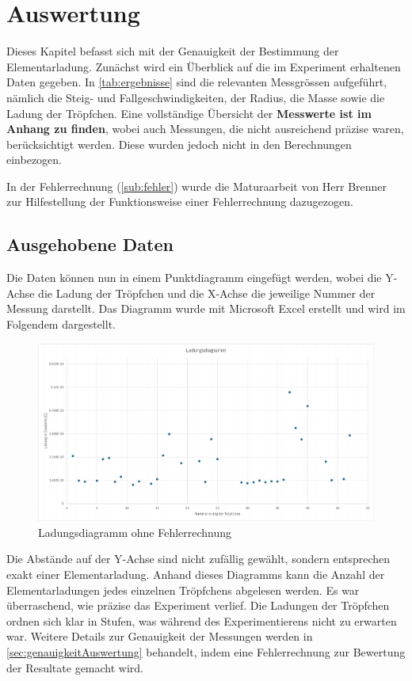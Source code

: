 \chapter{Auswertung}\label{cha:auswertung}
Dieses Kapitel befasst sich mit der Genauigkeit der Bestimmung der Elementarladung. Zunächst wird ein Überblick auf die im Experiment erhaltenen Daten gegeben. In \autoref{tab:ergebnisse} sind die relevanten Messgrössen aufgeführt, nämlich die Steig- und Fallgeschwindigkeiten, der Radius, die Masse sowie die Ladung der Tröpfchen. Eine vollständige Übersicht der \textbf{Messwerte ist im Anhang zu finden}, wobei auch Messungen, die nicht ausreichend präzise waren, berücksichtigt werden. Diese wurden jedoch nicht in den Berechnungen einbezogen.

In der Fehlerrechnung (\autoref{sub:fehler}) wurde die Maturaarbeit von Herr Brenner \parencite{maturaarbeitBrenner} zur Hilfestellung der Funktionsweise einer Fehlerrechnung dazugezogen.

\section{Ausgehobene Daten}\label{sec:aushebungDaten}
Die Daten können nun in einem Punktdiagramm eingefügt werden, wobei die Y-Achse die Ladung der Tröpfchen und die X-Achse die jeweilige Nummer der Messung darstellt. Das Diagramm wurde mit Microsoft Excel erstellt und wird im Folgendem dargestellt.

\begin{figure}[h]
	\centering
	\includegraphics[width=\textwidth]{bilder/pdf/LadungsdiagrammOhne.pdf}
	\caption{Ladungsdiagramm ohne Fehlerrechnung}
	\label{fig:ladungsdiagrammOFehlerrechnung}
\end{figure}

\noindent Die Abstände auf der Y-Achse sind nicht zufällig gewählt, sondern entsprechen exakt einer Elementarladung. Anhand dieses Diagramms kann die Anzahl der Elementarladungen jedes einzelnen Tröpfchens abgelesen werden. Es war überraschend, wie präzise das Experiment verlief. Die Ladungen der Tröpfchen ordnen sich klar in Stufen, was während des Experimentierens nicht zu erwarten war. Weitere Details zur Genauigkeit der Messungen werden in \autoref{sec:genauigkeitAuswertung} behandelt, indem eine Fehlerrechnung zur Bewertung der Resultate gemacht wird. 

